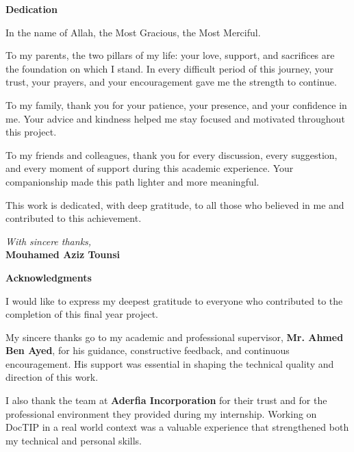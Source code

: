 \documentclass[12pt,a4paper,oneside]{report}
\newcommand{\frontpagetitle}[1]{%
    \thispagestyle{plain}%
    \vspace*{0.8cm}%
    \begin{center}%
        {\bfseries\LARGE #1}%
    \end{center}%
    \vspace{1.0cm}%
}
\begin{document}
\endgroup

\newpage

\frontpagetitle{Dedication}
{}

\begingroup
{}
\setlength{\parskip}{0.8em}

In the name of Allah, the Most Gracious, the Most Merciful.

To my parents, the two pillars of my life: your love, support, and sacrifices are the foundation on which I stand. In every difficult period of this journey, your trust, your prayers, and your encouragement gave me the strength to continue.

To my family, thank you for your patience, your presence, and your confidence in me. Your advice and kindness helped me stay focused and motivated throughout this project.

To my friends and colleagues, thank you for every discussion, every suggestion, and every moment of support during this academic experience. Your companionship made this path lighter and more meaningful.

This work is dedicated, with deep gratitude, to all those who believed in me and contributed to this achievement.

\vfill
\begin{flushright}
\textit{With sincere thanks,}\\
\textbf{Mouhamed Aziz Tounsi}
\end{flushright}

\endgroup

\newpage

\frontpagetitle{Acknowledgments}
{}

\begingroup
{}
\setlength{\parskip}{0.8em}

I would like to express my deepest gratitude to everyone who contributed to the completion of this final year project.

My sincere thanks go to my academic and professional supervisor, \textbf{Mr. Ahmed Ben Ayed}, for his guidance, constructive feedback, and continuous encouragement. His support was essential in shaping the technical quality and direction of this work.

I also thank the team at \textbf{Aderfia Incorporation} for their trust and for the professional environment they provided during my internship. Working on DocTIP in a real world context was a valuable experience that strengthened both my technical and personal skills.
\end{document}
